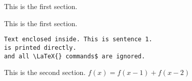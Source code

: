 This is the first section.


This is the first section.
\begin{verbatim}
Text enclosed inside. This is sentence 1.
is printed directly. 
and all \LaTeX{} commands$ are ignored.
\end{verbatim}

This is the second section.
$f(x)=f(x-1)+f(x-2)$
